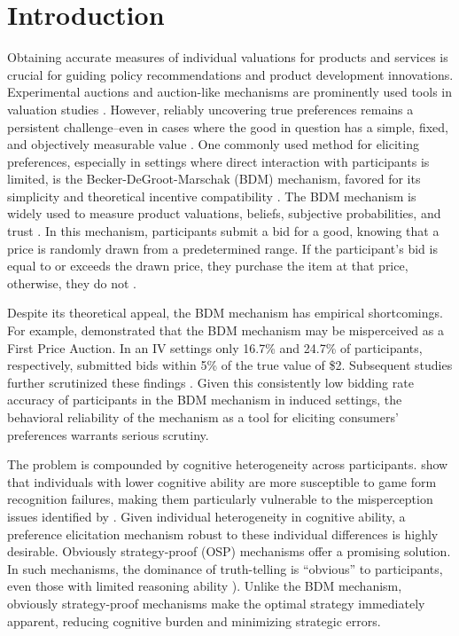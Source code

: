 \documentclass[12pt]{article}
\begin{document}
\section{Introduction}
Obtaining accurate measures of individual valuations for products and services is crucial for guiding policy recommendations and product development innovations. Experimental auctions and auction-like mechanisms are prominently used tools in valuation studies \citep{lusk2007experimental,canavari2019run}. However, reliably uncovering true preferences remains a persistent challenge--even in cases where the good in question has a simple, fixed, and objectively measurable value \citep{drichoutis2022game, cason_misconceptions_2014}. One commonly used method for eliciting preferences, especially in settings where direct interaction with participants is limited, is the Becker-DeGroot-Marschak (BDM) mechanism,  favored for its simplicity and theoretical incentive compatibility \citep{mamadehussene2023reliability, azrieli2018incentives}. The BDM mechanism is widely used to measure product valuations, beliefs, subjective probabilities, and trust  \citep{mamadehussene2023reliability, ahles_testing_2024, burdea2022online}. In this mechanism, participants submit a bid for a good, knowing that a price is randomly drawn from a predetermined range. If the participant's bid is equal to or exceeds the drawn price, they purchase the item at that price, otherwise, they do not \citep{becker_measuring_1964}.

Despite its theoretical appeal, the BDM mechanism has empirical shortcomings. For example, 
\citet{cason_misconceptions_2014} demonstrated that the BDM mechanism may be misperceived as a First Price Auction. In an IV settings only 16.7\% and 24.7\% of participants, respectively, submitted bids within 5\% of the true value of \$2.
Subsequent studies further scrutinized these findings \citep{DrichoutisEtAl2024incentives,bull2019failure,martin2022cognitive}. Given this consistently low bidding rate accuracy of participants in the BDM mechanism in induced settings, the behavioral reliability of the mechanism as a tool for eliciting consumers' preferences warrants serious scrutiny.

The problem is compounded by cognitive heterogeneity across participants. \citet{drichoutis2022game} show that individuals with lower cognitive ability are more susceptible to game form recognition failures, making them particularly vulnerable to the misperception issues identified by \citet{cason_misconceptions_2014}. Given individual heterogeneity in cognitive ability, a preference elicitation mechanism robust to these individual differences is highly desirable.
Obviously strategy-proof (OSP) mechanisms offer a promising solution. In such mechanisms, the dominance of truth-telling is ``obvious'' to participants, even those with limited reasoning ability \citep{li_obviously_2017}). Unlike the BDM mechanism, obviously strategy-proof mechanisms make the optimal strategy immediately apparent, reducing cognitive burden and minimizing strategic errors. 
\end{document}
